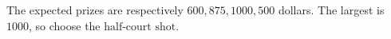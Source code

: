 The expected prizes are respectively $600,875,1000,500$ dollars. The largest is $1000$, so choose the $\boxed{\text{half-court shot}}$.
